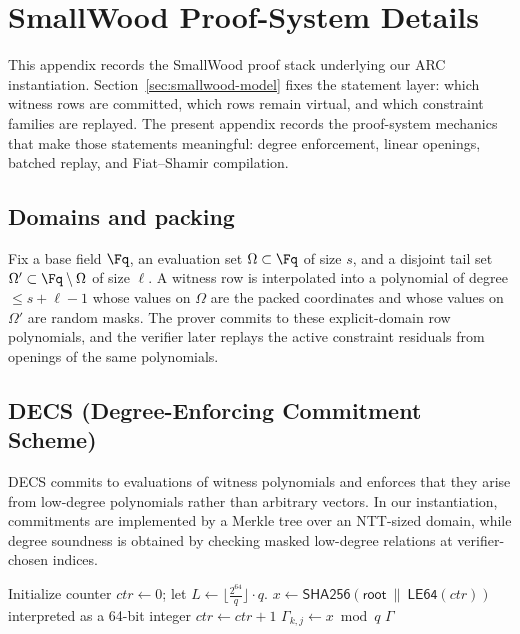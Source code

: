 \section{SmallWood Proof-System Details}
\label{app:smallwood}

This appendix records the SmallWood proof stack underlying our ARC
instantiation. Section~\ref{sec:smallwood-model} fixes the statement layer:
which witness rows are committed, which rows remain virtual, and which
constraint families are replayed. The present appendix records the proof-system
mechanics that make those statements meaningful: degree enforcement, linear
openings, batched replay, and Fiat--Shamir compilation.

\newcommand{\NTT}{\mathrm{NTT}}

\subsection{Domains and packing}
Fix a base field \(\Fq\), an evaluation set \(\Omega\subset\Fq\) of size
\(s\), and a disjoint tail set \(\Omega'\subset\Fq\setminus\Omega\) of size
\(\ell\). A witness row is interpolated into a polynomial of degree
\(\le s+\ell-1\) whose values on \(\Omega\) are the packed coordinates and
whose values on \(\Omega'\) are random masks. The prover commits to these
explicit-domain row polynomials, and the verifier later replays the active
constraint residuals from openings of the same polynomials.

\subsection{DECS (Degree-Enforcing Commitment Scheme)}
DECS commits to evaluations of witness polynomials and enforces that they arise
from low-degree polynomials rather than arbitrary vectors. In our
instantiation, commitments are implemented by a Merkle tree over an NTT-sized
domain, while degree soundness is obtained by checking masked low-degree
relations at verifier-chosen indices.

\begin{algorithm}[H]
\caption{\textsf{DECS.DeriveGamma}(\(\mathsf{root},\eta,r,q\)) \(\to \Gamma\) (verifier and prover)}
\label{alg:decs-derivegamma}
\begin{algorithmic}[1]
\State Initialize counter \(ctr\gets 0\); let \(L\gets \big\lfloor \frac{2^{64}}{q}\big\rfloor\cdot q\).
    \Repeat
      \State \(x \gets \textsf{SHA256}(\mathsf{root}\ \|\ \textsf{LE64}(ctr))\) interpreted as a 64-bit integer
      \State \(ctr\gets ctr+1\)
    \State \(\Gamma_{k,j}\gets x \bmod q\)
  \EndFor
\EndFor
\State \Return \(\Gamma\)
\end{algorithmic}
\end{algorithm}

